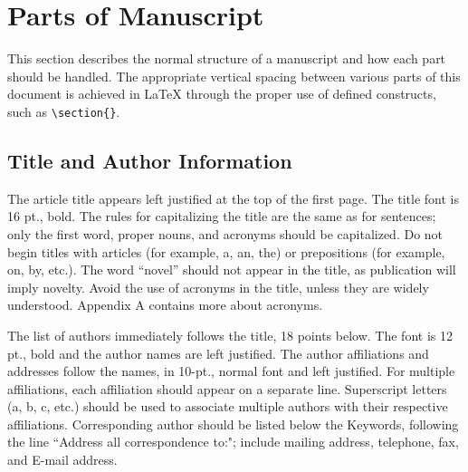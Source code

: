 \section{Parts of Manuscript} 

This section describes the normal structure of a manuscript and how each part should be handled. The appropriate vertical spacing between various parts of this document is achieved in LaTeX through the proper use of defined constructs, such as \verb|\section{}|. 

\subsection{Title and Author Information} 
\label{sect:title}
The article title appears left justified at the top of the first page. The title font is 16 pt., bold. The rules for capitalizing the title are the same as for sentences; only the first word, proper nouns, and acronyms should be capitalized. Do not begin titles with articles (for example, a, an, the) or prepositions (for example, on, by, etc.). The word “novel” should not appear in the title, as publication will imply novelty. Avoid the use of acronyms in the title, unless they are widely understood. Appendix A contains more about acronyms.

The list of authors immediately follows the title, 18 points below. The font is 12 pt., bold and the author names are left justified. The author affiliations and addresses follow the names, in 10-pt., normal font and left justified. For multiple affiliations, each affiliation should appear on a separate line. Superscript letters (a, b, c, etc.) should be used to associate multiple authors with their respective affiliations. Corresponding author should be listed below the Keywords, following the line ``Address all correspondence to:"; include mailing address, telephone, fax, and E-mail address.

